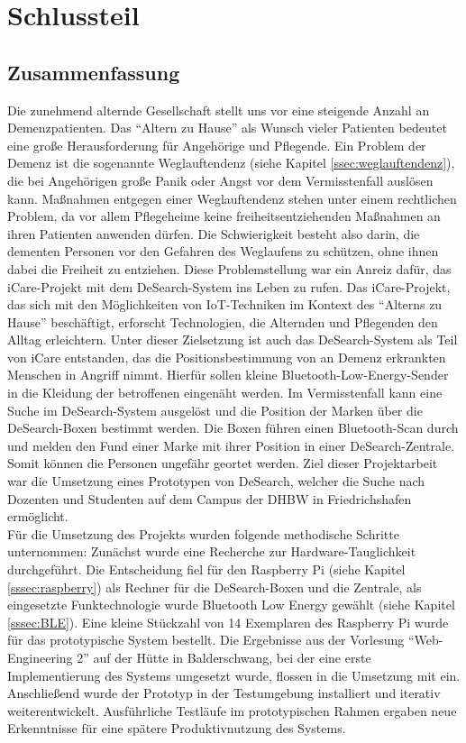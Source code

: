 \section{Schlussteil}
\subsection{Zusammenfassung}
Die zunehmend alternde Gesellschaft stellt uns vor eine steigende Anzahl an Demenzpatienten. Das \enquote{Altern zu Hause} als Wunsch vieler Patienten bedeutet eine große Herausforderung für Angehörige und Pflegende. Ein Problem der Demenz ist die sogenannte Weglauftendenz (siehe Kapitel \ref{ssec:weglauftendenz}), die bei Angehörigen große Panik oder Angst vor dem Vermisstenfall auslösen kann. Maßnahmen entgegen einer Weglauftendenz stehen unter einem rechtlichen Problem, da vor allem Pflegeheime keine freiheitsentziehenden Maßnahmen an ihren Patienten anwenden dürfen. Die Schwierigkeit besteht also darin, die dementen Personen vor den Gefahren des Weglaufens zu schützen, ohne ihnen dabei die Freiheit zu entziehen. Diese Problemstellung war ein Anreiz dafür, das iCare-Projekt mit dem DeSearch-System ins Leben zu rufen. Das iCare-Projekt, das sich mit den Möglichkeiten von IoT-Techniken im Kontext des \enquote{Alterns zu Hause} beschäftigt, erforscht Technologien, die Alternden und Pflegenden den Alltag erleichtern. Unter dieser Zielsetzung ist auch das DeSearch-System als Teil von iCare entstanden, das die Positionsbestimmung von an Demenz erkrankten Menschen in Angriff nimmt.  Hierfür sollen kleine Bluetooth-Low-Energy-Sender in die Kleidung der betroffenen eingenäht werden. Im Vermisstenfall kann eine Suche im DeSearch-System ausgelöst und die Position der Marken über die DeSearch-Boxen bestimmt werden. Die Boxen führen einen Bluetooth-Scan durch und melden den Fund einer Marke mit ihrer Position in einer DeSearch-Zentrale. Somit können die Personen ungefähr geortet werden. Ziel dieser Projektarbeit war die Umsetzung eines Prototypen von DeSearch, welcher die Suche nach Dozenten und Studenten auf dem Campus der DHBW in Friedrichshafen ermöglicht.\\
Für die Umsetzung des Projekts wurden folgende methodische Schritte unternommen: Zunächst wurde eine Recherche zur Hardware-Tauglichkeit durchgeführt. Die Entscheidung fiel für den Raspberry Pi (siehe Kapitel \ref{sssec:raspberry}) als Rechner für die DeSearch-Boxen und die Zentrale, als eingesetzte Funktechnologie wurde Bluetooth Low Energy gewählt (siehe Kapitel \ref{sssec:BLE}). Eine kleine Stückzahl von 14 Exemplaren des Raspberry Pi wurde für das prototypische System bestellt. Die Ergebnisse aus der Vorlesung \enquote{Web-Engineering 2} auf der Hütte in Balderschwang, bei der eine erste Implementierung des Systems umgesetzt wurde, flossen in die Umsetzung mit ein. Anschließend wurde der Prototyp in der Testumgebung installiert und iterativ weiterentwickelt. Ausführliche Testläufe im prototypischen Rahmen ergaben neue Erkenntnisse für eine spätere Produktivnutzung des Systems.\\
